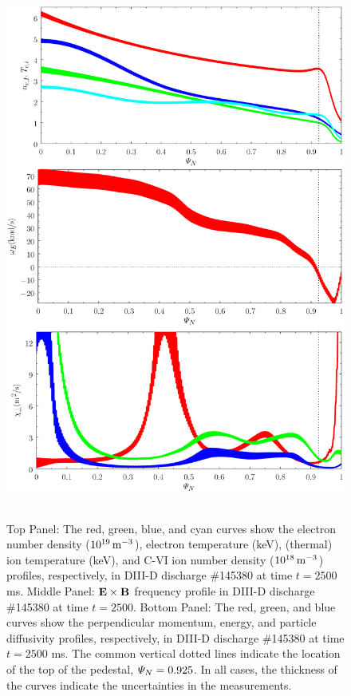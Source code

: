 \documentclass[12pt,prb,aps]{revtex4-1}
\begin{document}
\begin{figure}
\includegraphics[height=7in]{fig3.pdf}
\caption{Top Panel: The red, green, blue, and cyan curves show the electron number density ($10^{19}\,{\rm m}^{-3}$),
electron temperature (keV), (thermal) ion temperature (keV), and
 C-VI ion number density  ($10^{18}\,{\rm m}^{-3}$)  profiles, respectively,  in  DIII-D discharge \#145380 at time $t=2500$ ms. Middle Panel:  
 ${\bf E}\times {\bf B}$ frequency profile in  DIII-D discharge \#145380 at time $t=2500$. Bottom Panel: The red, green, and blue curves show
 the perpendicular momentum, energy, and particle diffusivity profiles, respectively, 
 in  DIII-D discharge \#145380 at time $t=2500$ ms.
The   common vertical dotted lines indicate the location of the top
of the pedestal, ${\mit\Psi}_N=0.925$. In all cases, the thickness of the curves indicate the uncertainties in the measurements.} \label{fig3}
\end{figure}
\end{document}
